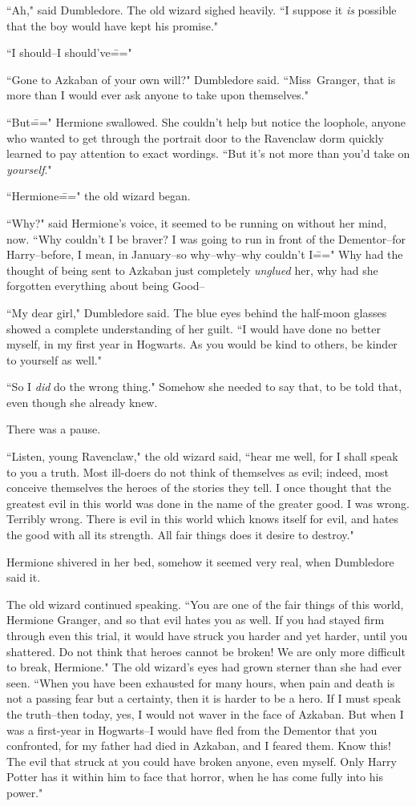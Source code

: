 ``Ah," said Dumbledore. The old wizard sighed heavily. ``I suppose it \emph{is} possible that the boy would have kept his promise."

``I should\---I should've\==="

``Gone to Azkaban of your own will?" Dumbledore said. ``Miss~Granger, that is more than I would ever ask anyone to take upon themselves."

``But\===" Hermione swallowed. She couldn't help but notice the loophole, anyone who wanted to get through the portrait door to the Ravenclaw dorm quickly learned to pay attention to exact wordings. ``But it's not more than you'd take on \emph{yourself}."

``Hermione\===" the old wizard began.

``Why?" said Hermione's voice, it seemed to be running on without her mind, now. ``Why couldn't I be braver? I was going to run in front of the Dementor\---for Harry\---before, I mean, in January\---so why\---why\---why couldn't I\===" Why had the thought of being sent to Azkaban just completely \emph{unglued} her, why had she forgotten everything about being Good\---

``My dear girl," Dumbledore said. The blue eyes behind the half-moon glasses showed a complete understanding of her guilt. ``I would have done no better myself, in my first year in Hogwarts. As you would be kind to others, be kinder to yourself as well."

``So I \emph{did} do the wrong thing." Somehow she needed to say that, to be told that, even though she already knew.

There was a pause.

``Listen, young Ravenclaw," the old wizard said, ``hear me well, for I shall speak to you a truth. Most ill-doers do not think of themselves as evil; indeed, most conceive themselves the heroes of the stories they tell. I once thought that the greatest evil in this world was done in the name of the greater good. I was wrong. Terribly wrong. There is evil in this world which knows itself for evil, and hates the good with all its strength. All fair things does it desire to destroy."

Hermione shivered in her bed, somehow it seemed very real, when Dumbledore said it.

The old wizard continued speaking. ``You are one of the fair things of this world, Hermione Granger, and so that evil hates you as well. If you had stayed firm through even this trial, it would have struck you harder and yet harder, until you shattered. Do not think that heroes cannot be broken! We are only more difficult to break, Hermione." The old wizard's eyes had grown sterner than she had ever seen. ``When you have been exhausted for many hours, when pain and death is not a passing fear but a certainty, then it is harder to be a hero. If I must speak the truth\---then today, yes, I would not waver in the face of Azkaban. But when I was a first-year in Hogwarts\---I would have fled from the Dementor that you confronted, for my father had died in Azkaban, and I feared them. Know this! The evil that struck at you could have broken anyone, even myself. Only Harry Potter has it within him to face that horror, when he has come fully into his power."

